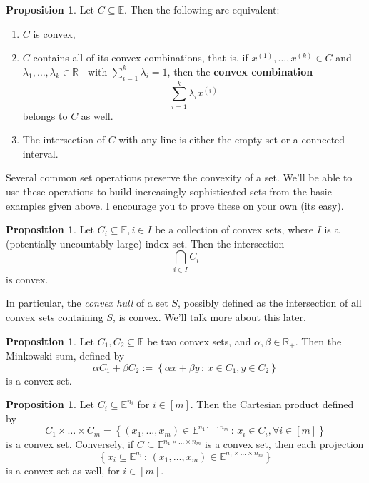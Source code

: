 \documentclass[11pt]{article}
\numberwithin{equation}{section}
\theoremstyle{definition}
\newtheorem{proposition}[theorem]{Proposition}
\newcommand{\bE}{\mathbb{E}}
\newcommand{\bR}{\mathbb{R}}
\newcommand{\set}[2]{\left\{#1\,:\,#2\right\}}
\begin{document}
\begin{proposition}
    Let $C\subseteq\bE$. Then the following are equivalent:
    \begin{enumerate}[label=(\roman*)]
        \item $C$ is convex,
        \item $C$ contains all of its convex combinations, that is, if $x^{(1)}, \dots, x^{(k)}\in C$ and $\lambda_1, \dots, \lambda_k\in\bR_+$ with $\sum_{i=1}^k\lambda_i=1$, then the \textbf{convex combination}\footnotemark
        \begin{equation}\sum_{i=1}^k\lambda_ix^{(i)}\end{equation} belongs to $C$ as well.
        \item The intersection of $C$ with any line is either the empty set or a connected interval.
        \end{enumerate}
\end{proposition}
Several common set operations preserve the convexity of a set. We'll be able to use these operations to build increasingly sophisticated sets from the basic examples given above. 
I encourage you to prove these on your own (its easy).
\begin{proposition}
    \label{propcvxintersection}
    Let $C_i\subseteq\bE, i\in I$ be a collection of convex sets, where $I$ is a (potentially uncountably large) index set. Then the intersection
    \begin{equation}
        \bigcap_{i\in I} C_i
    \end{equation}
    is convex.
\end{proposition}
In particular, the \textit{convex hull} of a set $S$, possibly defined as the intersection of all convex sets containing $S$, is convex. We'll talk more about this later.
\begin{proposition}
    Let $C_1, C_2\subseteq\bE$ be two convex sets, and $\alpha,\beta\in\bR_+$. Then the Minkowski sum, defined by
    \begin{equation}
        \alpha C_1+\beta C_2:=\set{\alpha x+\beta y}{x\in C_1, y\in C_2}
    \end{equation}
    is a convex set.
\end{proposition}
\begin{proposition}
    Let $C_i\subseteq\bE^{n_i}$ for $i\in[m]$. Then the Cartesian product defined by
    \begin{equation}
        C_1\times\dots\times C_m=\set{(x_1, \dots, x_m)\in\bE^{n_1\cdot\dots\cdot n_m}}{x_i\in C_i, \forall i\in[m]}
    \end{equation}
    is a convex set. Conversely, if $C\subseteq\bE^{{n_1}\times\dots\times{n_m}}$ is a convex set, then each projection
    \begin{equation}
        \set{x_i\subseteq\bE^{n_i}}{(x_1,\dots, x_m)\in\bE^{n_1\times\dots\times n_m}}
    \end{equation}
    is a convex set as well, for $i\in [m]$.
\end{proposition}
\end{document}
